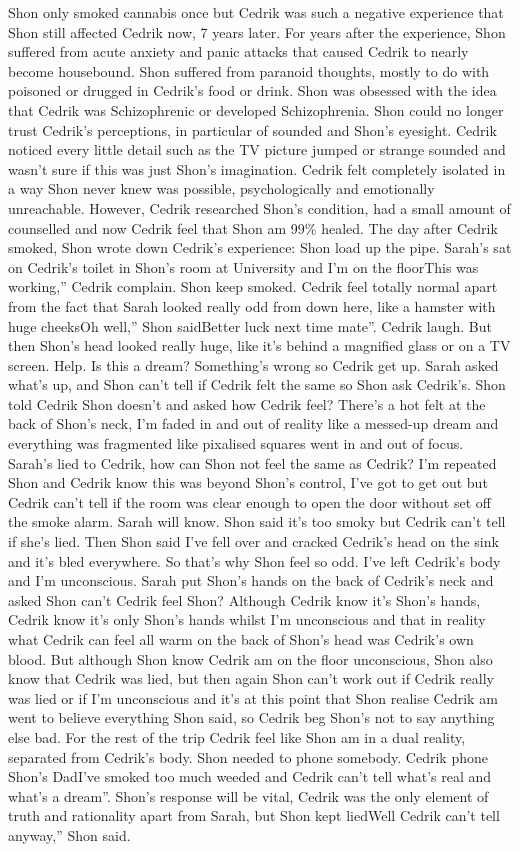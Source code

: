 \documentclass[12pt]{book}
\begin{document}
Shon only smoked cannabis once but Cedrik was such a negative experience that Shon still affected Cedrik now, 7 years later. For years after the experience, Shon suffered from acute anxiety and panic attacks that caused Cedrik to nearly become housebound. Shon suffered from paranoid thoughts, mostly to do with poisoned or drugged in Cedrik's food or drink. Shon was obsessed with the idea that Cedrik was Schizophrenic or developed Schizophrenia. Shon could no longer trust Cedrik's perceptions, in particular of sounded and Shon's eyesight. Cedrik noticed every little detail such as the TV picture jumped or strange sounded and wasn't sure if this was just Shon's imagination. Cedrik felt completely isolated in a way Shon never knew was possible, psychologically and emotionally unreachable. However, Cedrik researched Shon's condition, had a small amount of counselled and now Cedrik feel that Shon am 99\% healed. The day after Cedrik smoked, Shon wrote down Cedrik's experience: Shon load up the pipe. Sarah's sat on Cedrik's toilet in Shon's room at University and I'm on the floorThis was working,'' Cedrik complain. Shon keep smoked. Cedrik feel totally normal apart from the fact that Sarah looked really odd from down here, like a hamster with huge cheeksOh well,'' Shon saidBetter luck next time mate''. Cedrik laugh. But then Shon's head looked really huge, like it's behind a magnified glass or on a TV screen. Help. Is this a dream? Something's wrong so Cedrik get up. Sarah asked what's up, and Shon can't tell if Cedrik felt the same so Shon ask Cedrik's. Shon told Cedrik Shon doesn't and asked how Cedrik feel? There's a hot felt at the back of Shon's neck, I'm faded in and out of reality like a messed-up dream and everything was fragmented like pixalised squares went in and out of focus. Sarah's lied to Cedrik, how can Shon not feel the same as Cedrik? I'm repeated Shon and Cedrik know this was beyond Shon's control, I've got to get out but Cedrik can't tell if the room was clear enough to open the door without set off the smoke alarm. Sarah will know. Shon said it's too smoky but Cedrik can't tell if she's lied. Then Shon said I've fell over and cracked Cedrik's head on the sink and it's bled everywhere. So that's why Shon feel so odd. I've left Cedrik's body and I'm unconscious. Sarah put Shon's hands on the back of Cedrik's neck and asked Shon can't Cedrik feel Shon? Although Cedrik know it's Shon's hands, Cedrik know it's only Shon's hands whilst I'm unconscious and that in reality what Cedrik can feel all warm on the back of Shon's head was Cedrik's own blood. But although Shon know Cedrik am on the floor unconscious, Shon also know that Cedrik was lied, but then again Shon can't work out if Cedrik really was lied or if I'm unconscious and it's at this point that Shon realise Cedrik am went to believe everything Shon said, so Cedrik beg Shon's not to say anything else bad. For the rest of the trip Cedrik feel like Shon am in a dual reality, separated from Cedrik's body. Shon needed to phone somebody. Cedrik phone Shon's DadI've smoked too much weeded and Cedrik can't tell what's real and what's a dream''. Shon's response will be vital, Cedrik was the only element of truth and rationality apart from Sarah, but Shon kept liedWell Cedrik can't tell anyway,'' Shon said. 
\end{document}
